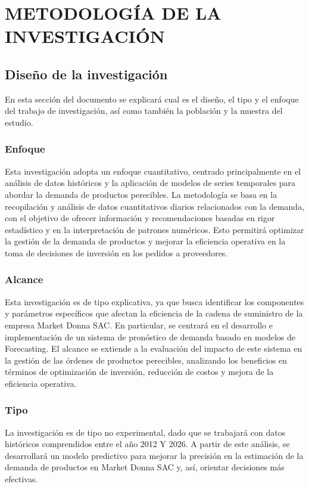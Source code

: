 \chapter{METODOLOGÍA DE LA INVESTIGACIÓN}
\section{Diseño de la investigación}
En esta sección del documento se explicará cual es el diseño, el tipo y el enfoque del trabajo de investigación, así como también la población y la muestra del estudio. 
\subsection{Enfoque}
Esta investigación adopta un enfoque cuantitativo, centrado principalmente en el análisis de datos históricos y la aplicación de modelos de series temporales para abordar la demanda de productos perecibles. La metodología se basa en la recopilación y análisis de datos cuantitativos diarios relacionados con la demanda, con el objetivo de ofrecer información y recomendaciones basadas en rigor estadístico y en la interpretación de patrones numéricos. Esto permitirá optimizar la gestión de la demanda de productos y mejorar la eficiencia operativa en la toma de decisiones de inversión en los pedidos a proveedores.

\subsection{Alcance}
Esta investigación es de tipo explicativa, ya que busca identificar los componentes y parámetros específicos que afectan la eficiencia de la cadena de suministro de la empresa Market Donna SAC. En particular, se centrará en el desarrollo e implementación de un sistema de pronóstico de demanda basado en modelos de Forecasting. El alcance se extiende a la evaluación del impacto de este sistema en la gestión de las órdenes de productos perecibles, analizando los beneficios en términos de optimización de inversión, reducción de costos y mejora de la eficiencia operativa.

\subsection{Tipo}
La investigación es de tipo no experimental, dado que se trabajará con datos históricos comprendidos entre el año 2012 Y 2026. A partir de este análisis, se desarrollará un modelo predictivo para mejorar la precisión en la estimación de la demanda de productos en Market Donna SAC y, así, orientar decisiones más efectivas. 

